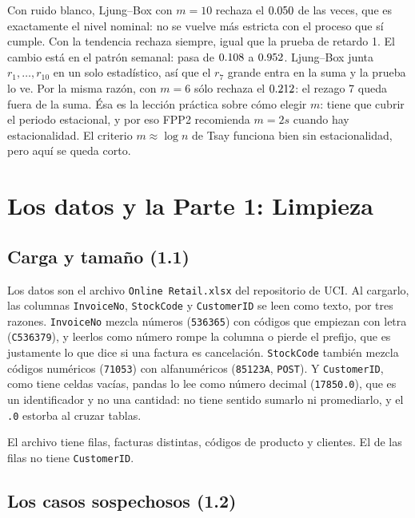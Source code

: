 \documentclass[11pt,letterpaper]{article}
\newcommand{\code}[1]{\texttt{#1}}
\begin{document}
Con ruido blanco, Ljung--Box con $m=10$ rechaza el $0.050$ de las
veces, que es exactamente el nivel nominal: no se vuelve más estricta con el
proceso que sí cumple. Con la tendencia rechaza siempre, igual que la prueba
de retardo 1. El cambio está en el patrón semanal: pasa de $0.108$ a
$0.952$. Ljung--Box junta $r_1,\dots,r_{10}$ en un solo estadístico, así
que el $r_7$ grande entra en la suma y la prueba lo ve. Por la misma razón,
con $m=6$ sólo rechaza el $0.212$: el rezago 7 queda fuera de la suma.
Ésa es la lección práctica sobre cómo elegir $m$: tiene que cubrir el periodo
estacional, y por eso FPP2 recomienda $m=2s$ cuando hay estacionalidad. El
criterio $m\approx\log n$ de Tsay funciona bien sin estacionalidad, pero aquí
se queda corto.

\newpage
\section{Los datos y la Parte 1: Limpieza}

\subsection{Carga y tamaño (1.1)}

Los datos son el archivo \code{Online Retail.xlsx} del repositorio de UCI. Al
cargarlo, las columnas \code{InvoiceNo}, \code{StockCode} y \code{CustomerID}
se leen como texto, por tres razones. \code{InvoiceNo} mezcla números
(\code{536365}) con códigos que empiezan con letra (\code{C536379}), y
leerlos como número rompe la columna o pierde el prefijo, que es justamente lo
que dice si una factura es cancelación. \code{StockCode} también mezcla
códigos numéricos (\code{71053}) con alfanuméricos (\code{85123A},
\code{POST}). Y \code{CustomerID}, como tiene celdas vacías, pandas lo lee
como número decimal (\code{17850.0}), que es un identificador y no una
cantidad: no tiene sentido sumarlo ni promediarlo, y el \code{.0} estorba al
cruzar tablas.

El archivo tiene \FilasCrudas{} filas, \Facturas{} facturas distintas,
\Productos{} códigos de producto y \Clientes{} clientes. El \FracSinCliente{}
de las filas no tiene \code{CustomerID}.

\subsection{Los casos sospechosos (1.2)}
\end{document}
